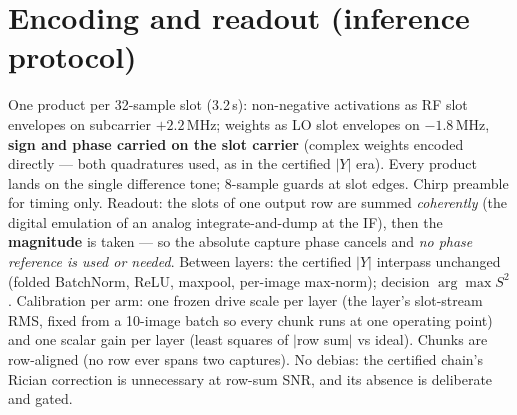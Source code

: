 \documentclass[11pt]{article}
\begin{document}
\section{Encoding and readout (inference protocol)}
One product per 32-sample slot (3.2\,\textmu s): non-negative
activations as RF slot envelopes on subcarrier $+2.2$\,MHz; weights as
LO slot envelopes on $-1.8$\,MHz, \textbf{sign and phase carried on
the slot carrier} (complex weights encoded directly --- both
quadratures used, as in the certified $|Y|$ era). Every product lands
on the single difference tone; 8-sample guards at slot edges. Chirp
preamble for timing only. Readout: the slots of one output row are
summed \emph{coherently} (the digital emulation of an analog
integrate-and-dump at the IF), then the \textbf{magnitude} is taken
--- so the absolute capture phase cancels and \emph{no phase
reference is used or needed}. Between layers: the certified $|Y|$
interpass unchanged (folded BatchNorm, ReLU, maxpool, per-image
max-norm); decision $\arg\max S^2$. Calibration per arm: one frozen
drive scale per layer (the layer's slot-stream RMS, fixed from a
10-image batch so every chunk runs at one operating point) and one
scalar gain per layer (least squares of $|$row sum$|$ vs ideal).
Chunks are row-aligned (no row ever spans two captures). No debias:
the certified chain's Rician correction is unnecessary at row-sum
SNR, and its absence is deliberate and gated.
\end{document}
